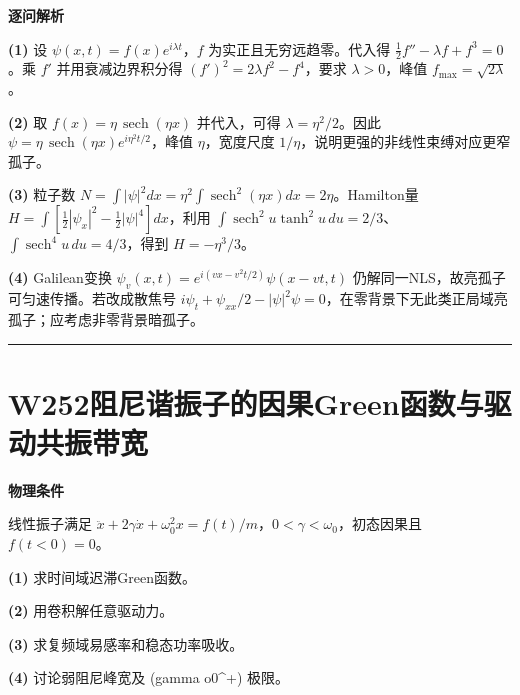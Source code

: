 \documentclass[UTF8,a4paper,11pt,oneside,openany]{ctexbook}
\begin{document}
\par\medskip\noindent\textbf{逐问解析}
\par\noindent\textbf{(1)} 设 \(\psi(x,t)=f(x)e^{i\lambda t}\)，\(f\) 为实正且无穷远趋零。代入得 \(\tfrac12f''-\lambda f+f^3=0\)。乘 \(f'\) 并用衰减边界积分得 \((f')^2=2\lambda f^2-f^4\)，要求 \(\lambda>0\)，峰值 \(f_{\max}=\sqrt{2\lambda}\)。
\par\noindent\textbf{(2)} 取 \(f(x)=\eta\,\operatorname{sech}(\eta x)\) 并代入，可得 \(\lambda=\eta^2/2\)。因此 \(\psi=\eta\,\operatorname{sech}(\eta x)e^{i\eta^2t/2}\)，峰值 \(\eta\)，宽度尺度 \(1/\eta\)，说明更强的非线性束缚对应更窄孤子。
\par\noindent\textbf{(3)} 粒子数 \(N=\int|\psi|^2dx=\eta^2\int\operatorname{sech}^2(\eta x)dx=2\eta\)。Hamilton量 \(H=\int[\tfrac12|\psi_x|^2-\tfrac12|\psi|^4]dx\)，利用 \(\int\operatorname{sech}^2u\tanh^2u\,du=2/3\)、\(\int\operatorname{sech}^4u\,du=4/3\)，得到 \(H=-\eta^3/3\)。
\par\noindent\textbf{(4)} Galilean变换 \(\psi_v(x,t)=e^{i(vx-v^2t/2)}\psi(x-vt,t)\) 仍解同一NLS，故亮孤子可匀速传播。若改成散焦号 \(i\psi_t+\psi_{xx}/2-|\psi|^2\psi=0\)，在零背景下无此类正局域亮孤子；应考虑非零背景暗孤子。

\par\bigskip\hrule\bigskip
\section*{W252\quad 阻尼谐振子的因果Green函数与驱动共振带宽}
\textbf{物理条件}\par 线性振子满足 \(\ddot x+2\gamma\dot x+\omega_0^2x=f(t)/m\)，\(0<\gamma<\omega_0\)，初态因果且 \(f(t<0)=0\)。
\par\noindent\textbf{(1)} 求时间域迟滞Green函数。
\par\noindent\textbf{(2)} 用卷积解任意驱动力。
\par\noindent\textbf{(3)} 求复频域易感率和稳态功率吸收。
\par\noindent\textbf{(4)} 讨论弱阻尼峰宽及 (gamma	o0\textasciicircum{}+) 极限。
\end{document}
